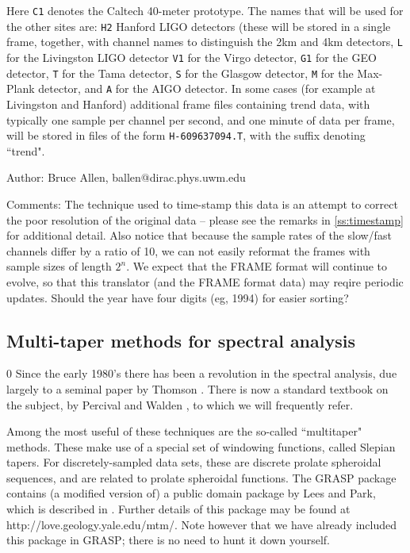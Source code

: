 Here {\tt C1} denotes the Caltech 40-meter prototype.
The names that will be used for the other sites are:
{\tt H2} Hanford LIGO
detectors (these will be stored in a single frame, together, with channel names
to distinguish the 2km and 4km detectors,
{\tt L} for the Livingston LIGO detector {\tt V1} for the
Virgo detector, {\tt G1} for the GEO detector, {\tt T} for the Tama
detector, {\tt S} for the Glasgow detector, {\tt M} for the Max-Plank
detector, and {\tt A} for the AIGO detector.
In some cases (for example at Livingston and Hanford) additional frame files
containing trend data, with typically one sample per channel per second, and
one minute of data per frame, will be stored in files of the form {\tt H-609637094.T},
with the suffix denoting ``trend".
\begin{description}
\item{Author:}
Bruce Allen, ballen@dirac.phys.uwm.edu
\item{Comments:}
The technique used to time-stamp this data is an attempt to correct
the poor resolution of the original data -- please see the remarks in
\ref{ss:timestamp} for additional detail.  Also notice that because
the sample rates of the slow/fast channels differ by a ratio of 10, we
can not easily reformat the frames with sample sizes of length $2^n$.
We expect that the FRAME format will continue to evolve, so that this
translator (and the FRAME format data) may reqire periodic updates.
Should the year have four digits (eg, 1994) for easier sorting?
\end{description}
\clearpage

\subsection{Multi-taper methods for spectral analysis}
\setcounter{equation}0
\label{ss:mtapintro}
Since the early 1980's there has been a revolution in the spectral
analysis, due largely to a seminal paper by Thomson \cite{thomson82}.
There is now a standard textbook on the subject, by Percival and Walden
\cite{percivalwalden}, to which we will frequently refer.

Among the most useful of these techniques are the so-called ``multitaper"
methods.  These make use of a special set of windowing functions,
called Slepian tapers.  For discretely-sampled data sets, these are
discrete prolate spheroidal sequences, and are related to prolate
spheroidal functions.   The GRASP package contains (a modified version
of) a public domain package by Lees and Park, which is described in
\cite{parklees}.  Further details of this package may be found at
{http://love.geology.yale.edu/mtm/}.
Note however that we have already
included this package in GRASP; there is no need to hunt it down yourself.


